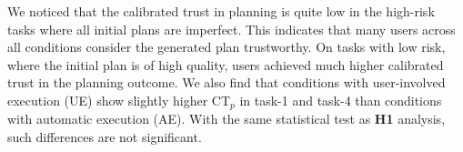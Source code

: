 
We noticed that the calibrated trust in planning is quite low in the high-risk tasks where all initial plans are imperfect. 
This indicates that many users across all conditions consider the generated plan trustworthy. 
On tasks with low risk, where the initial plan is of high quality, users achieved much higher calibrated trust in the planning outcome. 
We also find that conditions with user-involved execution (UE) show slightly higher CT$_p$ in task-1 and task-4 than conditions with automatic execution (AE). With the same statistical test as \textbf{H1} analysis, such differences are not significant.

